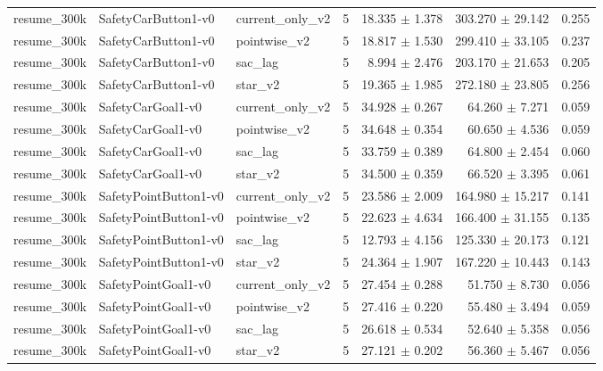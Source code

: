 \begin{table}[t]
\begin{tabular}{lllrrrr}
resume_300k & SafetyCarButton1-v0 & current_only_v2 & 5 & 18.335 $\pm$ 1.378 & 303.270 $\pm$ 29.142 & 0.255 \\
resume_300k & SafetyCarButton1-v0 & pointwise_v2 & 5 & 18.817 $\pm$ 1.530 & 299.410 $\pm$ 33.105 & 0.237 \\
resume_300k & SafetyCarButton1-v0 & sac_lag & 5 & 8.994 $\pm$ 2.476 & 203.170 $\pm$ 21.653 & 0.205 \\
resume_300k & SafetyCarButton1-v0 & star_v2 & 5 & 19.365 $\pm$ 1.985 & 272.180 $\pm$ 23.805 & 0.256 \\
resume_300k & SafetyCarGoal1-v0 & current_only_v2 & 5 & 34.928 $\pm$ 0.267 & 64.260 $\pm$ 7.271 & 0.059 \\
resume_300k & SafetyCarGoal1-v0 & pointwise_v2 & 5 & 34.648 $\pm$ 0.354 & 60.650 $\pm$ 4.536 & 0.059 \\
resume_300k & SafetyCarGoal1-v0 & sac_lag & 5 & 33.759 $\pm$ 0.389 & 64.800 $\pm$ 2.454 & 0.060 \\
resume_300k & SafetyCarGoal1-v0 & star_v2 & 5 & 34.500 $\pm$ 0.359 & 66.520 $\pm$ 3.395 & 0.061 \\
resume_300k & SafetyPointButton1-v0 & current_only_v2 & 5 & 23.586 $\pm$ 2.009 & 164.980 $\pm$ 15.217 & 0.141 \\
resume_300k & SafetyPointButton1-v0 & pointwise_v2 & 5 & 22.623 $\pm$ 4.634 & 166.400 $\pm$ 31.155 & 0.135 \\
resume_300k & SafetyPointButton1-v0 & sac_lag & 5 & 12.793 $\pm$ 4.156 & 125.330 $\pm$ 20.173 & 0.121 \\
resume_300k & SafetyPointButton1-v0 & star_v2 & 5 & 24.364 $\pm$ 1.907 & 167.220 $\pm$ 10.443 & 0.143 \\
resume_300k & SafetyPointGoal1-v0 & current_only_v2 & 5 & 27.454 $\pm$ 0.288 & 51.750 $\pm$ 8.730 & 0.056 \\
resume_300k & SafetyPointGoal1-v0 & pointwise_v2 & 5 & 27.416 $\pm$ 0.220 & 55.480 $\pm$ 3.494 & 0.059 \\
resume_300k & SafetyPointGoal1-v0 & sac_lag & 5 & 26.618 $\pm$ 0.534 & 52.640 $\pm$ 5.358 & 0.056 \\
resume_300k & SafetyPointGoal1-v0 & star_v2 & 5 & 27.121 $\pm$ 0.202 & 56.360 $\pm$ 5.467 & 0.056 \\
\bottomrule
\end{tabular}
\end{table}
